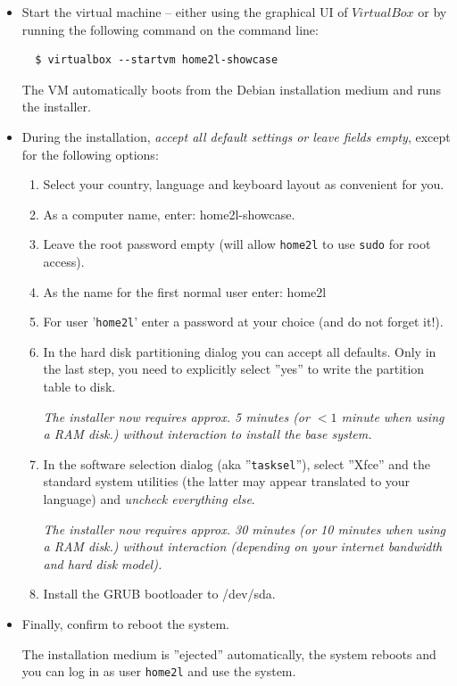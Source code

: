\documentclass[12pt,english,parskip=half]{scrreprt}
\newcommand{\lst}[1]{\colorbox{lstbackground}{\ttfamily\footnotesize#1}}
\begin{document}
\begin{itemize}[$\blacktriangleright$]

\item
  Start the virtual machine -- either using the graphical UI of $VirtualBox$ or by running the
  following command on the command line:

  \begin{lstlisting}
  $ virtualbox --startvm home2l-showcase
  \end{lstlisting}

  The VM automatically boots from the Debian installation medium and runs the installer.

\item
  During the installation, \emph{accept all default settings or leave fields empty},
  except for the following options:

  \begin{enumerate}
    \item Select your country, language and keyboard layout as convenient for you.
    \item As a computer name, enter: \lst{home2l-showcase}.
    \item Leave the root password empty (will allow \texttt{home2l} to use \texttt{sudo} for root access).
    \item As the name for the first normal user enter: \lst{home2l}
    \item For user '\texttt{home2l}' enter a password at your choice (and do not forget it!).
    \item In the hard disk partitioning dialog you can accept all defaults. Only in the last step, you need to
      explicitly select ''yes'' to write the partition table to disk.

      \emph{The installer now requires approx. 5 minutes (or $<1$ minute when using a RAM disk.)
        without interaction to install the base system.}

    \item In the software selection dialog (aka ''\texttt{tasksel}''), select ''\lst{Xfce}'' and the
      \lst{standard system utilities} (the latter may appear translated to your language) and
      \emph{uncheck everything else}.

      \emph{The installer now requires approx. 30 minutes  (or 10 minutes when using a RAM disk.)
        without interaction (depending on your internet bandwidth and hard disk model).}

    \item Install the GRUB bootloader to \lst{/dev/sda}.
  \end{enumerate}

\item
  Finally, confirm to reboot the system.

  The installation medium is ''ejected'' automatically, the system reboots and you can log in as user
  \texttt{home2l} and use the system.

\end{itemize}
\end{document}

